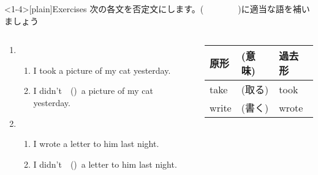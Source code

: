 \documentclass[aspectratio=169,xcolor={dvipsnames,table}]{beamer}
\newcommand{\myaudio}[1]{\href{#1}{\faVolumeUp}}
\begin{document}
\begin{frame}<1-4>[plain]{Exercises}
 次の各文を否定文にします。(~~~~~~~~)に適当な語を補いましょう

\begin{columns}
\begin{column}{.6\textwidth}
\begin{enumerate}
 \item \begin{enumerate}
	\item I took a picture of my cat yesterday.
	\item I didn't~~()\,\,\,a picture of my cat yesterday.
       \end{enumerate}
 \item \begin{enumerate}
	\item I wrote a letter to him last night.
	\item I didn't~~()\,\,\,a letter to him last night.
       \end{enumerate}
\end{enumerate}
\end{column}
\begin{column}{.35\textwidth}
{
\begin{tabular}{lll}\toprule
{\small 原形}&{\small (意味)}&{\small 過去形}\\\midrule
{take}&{{\small (取る)}}&{took}\\
{write}&{{\small (書く)}}&{wrote}\\
\bottomrule
\end{tabular}}%

\end{column}
\end{columns}
\hfill\myaudio{./audio/026_past_didnot_08.mp3}

\end{frame}
\end{document}
